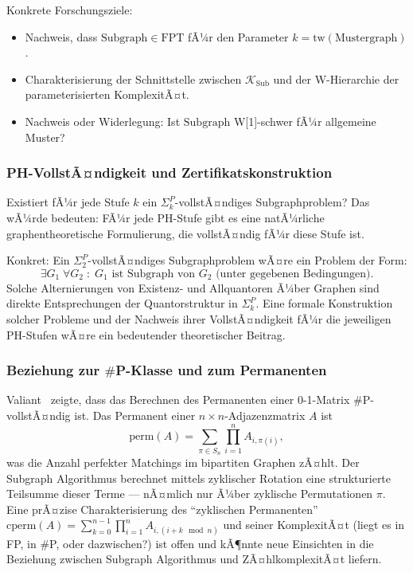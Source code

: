 ﻿\documentclass[a4paper,12pt]{article}
\theoremstyle{definition}
\begin{document}
Konkrete Forschungsziele:
\begin{itemize}
  \item Nachweis, dass $\mathrm{Subgraph} \in \mathrm{FPT}$ fÃ¼r den Parameter
        $k = \mathrm{tw}(\text{Mustergraph})$.
  \item Charakterisierung der Schnittstelle zwischen
        $\mathcal{K}_\mathrm{Sub}$ und der W-Hierarchie der parameterisierten KomplexitÃ¤t.
  \item Nachweis oder Widerlegung: Ist $\mathrm{Subgraph}$ W[1]-schwer
        fÃ¼r allgemeine Muster?
\end{itemize}

\subsubsection{PH-VollstÃ¤ndigkeit und Zertifikatskonstruktion}

Existiert fÃ¼r jede Stufe $k$ ein $\Sigma_k^P$-vollstÃ¤ndiges Subgraphproblem?
Das wÃ¼rde bedeuten: FÃ¼r jede PH-Stufe gibt es eine natÃ¼rliche graphentheoretische
Formulierung, die vollstÃ¤ndig fÃ¼r diese Stufe ist.

Konkret: Ein $\Sigma_2^P$-vollstÃ¤ndiges Subgraphproblem wÃ¤re ein Problem der Form:
\[
  \exists G_1 \;\forall G_2 \;:\; G_1 \text{ ist Subgraph von } G_2 \text{ (unter gegebenen Bedingungen)}.
\]
Solche Alternierungen von Existenz- und Allquantoren Ã¼ber Graphen sind direkte
Entsprechungen der Quantorstruktur in $\Sigma_k^P$.
Eine formale Konstruktion solcher Probleme und der Nachweis ihrer VollstÃ¤ndigkeit
fÃ¼r die jeweiligen PH-Stufen wÃ¤re ein bedeutender theoretischer Beitrag.

\subsubsection{Beziehung zur $\#$P-Klasse und zum Permanenten}

Valiant~\cite{valiant1979complexity} zeigte, dass das Berechnen des Permanenten
einer 0-1-Matrix $\#$P-vollstÃ¤ndig ist.
Das Permanent einer $n \times n$-Adjazenzmatrix $A$ ist
\[
  \mathrm{perm}(A) = \sum_{\pi \in S_n} \prod_{i=1}^n A_{i,\pi(i)},
\]
was die Anzahl perfekter Matchings im bipartiten Graphen zÃ¤hlt.
Der Subgraph Algorithmus berechnet mittels zyklischer Rotation eine
strukturierte Teilsumme dieser Terme --- nÃ¤mlich nur Ã¼ber zyklische Permutationen $\pi$.
Eine prÃ¤zise Charakterisierung des ``zyklischen Permanenten''
$\mathrm{cperm}(A) = \sum_{k=0}^{n-1} \prod_{i=1}^n A_{i,(i+k \mod n)}$
und seiner KomplexitÃ¤t (liegt es in FP, in $\#$P, oder dazwischen?) ist offen
und kÃ¶nnte neue Einsichten in die Beziehung zwischen Subgraph Algorithmus
und ZÃ¤hlkomplexitÃ¤t liefern.
\end{document}
